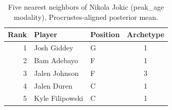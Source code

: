 \begin{table}[htbp]
  \centering\small
  \begin{tabular}{rllc}
    \toprule
    Rank & Player & Position & Archetype \\
    \midrule
    1 & Josh Giddey & G & 1 \\
    2 & Bam Adebayo & F & 1 \\
    3 & Jalen Johnson & F & 3 \\
    4 & Jalen Duren & C & 1 \\
    5 & Kyle Filipowski & C & 1 \\
    \bottomrule
  \end{tabular}
  \caption{Five nearest neighbors of Nikola Jokic (peak_age modality), Procrustes-aligned posterior mean.}
  \label{tab:Nikola_Jokic_neighbors_peak_age}
\end{table}

